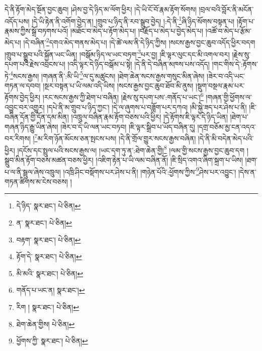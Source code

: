 དེ་ནི་རྟོག་མེད་སྔོན་བྱང་ཆུབ། །ཤེས་བྱ་དེ་ཉིད་མ་ལོག་ཕྱིར། །དེ་ཡི་ངོ་བོ་རྣམ་རྟོག་སོགས། །བྲལ་བའི་བློར་ནི་མངོན་འདོད་པས། །དེ་ཡི་རྟེན་ནི་འགོག་བྱེད་ན། །གྲུབ་པ་ཉིད་ནི་རབ་སྒྲུབ་བྱེད། །:དེ་ནི་\footnote{དེ་ཉིད་  སྣར་ཐང་།  པེ་ཅིན། }ཞི་ཉིད་སོགས་བསྟན་པ། །རྟོག་པ་རྣམས་ཀྱིས་སྒྲོ་བཏགས་པའོ། །མཐོང་བ་མེད་པ་རྟོག་མེད་པ། །བརྗོད་པ་མེད་པ་བྱེད་མེད་པ། །འཚོ་བ་མེད་པ་རྩོམ་མེད་པ། །དེ་བཞིན་\footnote{ན་  སྣར་ཐང་།  པེ་ཅིན། }དགའ་མེད་གནས་མེད་པ། །དེ་ཚེ་ལམ་ནི་དེ་ཉིད་ཀྱིས། །སངས་རྒྱས་བྱང་ཆུབ་འདོད་ཕྱིར་བདག །གྲུབ་པ་སྒྲུབ་པའི་སྐྱོན་ཡང་ཡིན། །བསྒོམ་ཉིད་ལ་ཡང་བཏག་\footnote{བརྟག་  སྣར་ཐང་།  པེ་ཅིན། }པར་བྱ། །ཇི་ལྟར་ལུང་དང་མི་འགལ་བར། །རྗེས་སུ་དཔག་པའི་རྗེས་འབྲངས་པ། །འདི་ལྟར་དེ་ཉིད་བསྒོམ་པ་སྟེ། །དེ་ནི་དེ་བཞིན་མཁས་པས་འདོད། །གང་གིས་དེ་:རྟོགས་ཏེ་\footnote{རྟོག་དེ་  སྣར་ཐང་།  པེ་ཅིན། }སངས་རྒྱས། །གཞན་ནི་:མི་ཡི་\footnote{མི་མའི་  སྣར་ཐང་།  པེ་ཅིན། }ལ་དུ་མཚུངས། །ཐེག་ཆེན་སངས་རྒྱས་གསུང་མིན་ཞེས། །ཟེར་བ་འདི་ཡང་གཏན་ལ་དབབ། །སྔར་བསྟན་པ་ཡི་ལམ་འདི་ཡིས། །སངས་རྒྱས་བྱང་ཆུབ་ཐོབ་མི་ནུས། །སྡུག་བསྔལ་རྣམ་པར་རྟོགས་བྱེད་ཕྱིར། །རང་སངས་རྒྱས་ཀྱི་ཐེག་པ་བཞིན། །རྗེས་སུ་དཔག་པས་:གནོད་པ་ཡང་།\footnote{གནོད་པ་ཡང་ན།  སྣར་ཐང་། } །གཞན་གྱི་ཕྱོགས་ལ་འབྱུང་བར་འགྱུར། །དཔེ་ནི་མ་གྲུབ་པ་ཉིད་ཀྱང་། །དེ་ལ་ཞུགས་པ་བཟློག་པར་དཀའ། །མི་སྐྱེ་ཟད་པར་ཤེས་པ་ནི། །ཇི་བཞིན་དོན་གྱི་དོན་དམ་མིན། །འཁྲུལ་བཞིན་རྣམ་རྟོག་བཅས་པའི་ཕྱིར། །དེ་རྟོགས་ཇི་ལྟར་དེ་ཉིད་ཡིན། །ཐེག་པ་གཞན་ཉིད་རྒྱུ་ཡིན་ཞེས། །ཟེར་བ་དེ་ཡི་ལན་ཡང་བཏབ། །ཇི་ལྟར་སྒྲིབ་པ་ཡོད་བཞིན་དུ། །དགྲ་བཅོམ་མྱ་ངན་འདའ་བར་རིགས། །\footnote{རིག །  སྣར་ཐང་།  པེ་ཅིན། }མ་རིག་ཉོན་མོངས་ཅན་སྤངས་པས། །དེ་ནི་གྲོལ་གྱུར་སངས་རྒྱས་བཞིན། །དེ་ནི་མི་བདེན་མེད་པའི་ཕྱིར། །དངོས་དང་སྤྲུལ་པའི་སངས་རྒྱས་ལ། །ཡང་དག་ཏུ་ན་:ཐེག་ཆེན་གྱི།\footnote{ཐེག་ཆེན་གྱིས།  པེ་ཅིན། } །ལམ་གྱི་སངས་རྒྱས་བྱང་ཆུབ་དག །སྒྲུབ་མིན་རྟོག་བཅས་མཚན་བཅས་ཕྱིར། །འཇིག་རྟེན་པ་ཡི་ལམ་བཞིན་ནོ། །ཇི་སྲིད་འགའ་ཞིག་སྐྲག་པ་ཡིས། །ཐག་པ་ལ་ནི་སྦྲུལ་ཞེས་འཁྲུལ། །འཁྲི་ཤིང་བསྡོགས་པར་ཤེས་པ་ནི། །གཉེན་པོའི་:ཕྱོགས་ཀྱིས་\footnote{ཕྱོགས་ཀྱི་  སྣར་ཐང་།  པེ་ཅིན། }ཤེས་པར་འབྱུང་། །དེས་ན་གཏན་ཚིགས་མ་ངེས་བཅས། །

